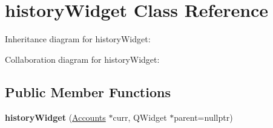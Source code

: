 \hypertarget{classhistoryWidget}{}\section{history\+Widget Class Reference}
\label{classhistoryWidget}


Inheritance diagram for history\+Widget\+:


Collaboration diagram for history\+Widget\+:
\subsection*{Public Member Functions}
\begin{DoxyCompactItemize}
\item 
\mbox{\label{classhistoryWidget_a0843e5d5c3c766bcdb3307fe00eb816a}} 
{\bfseries history\+Widget} (\hyperlink{classAccounts}{Accounts} $\ast$curr, Q\+Widget $\ast$parent=nullptr)
\end{DoxyCompactItemize}
